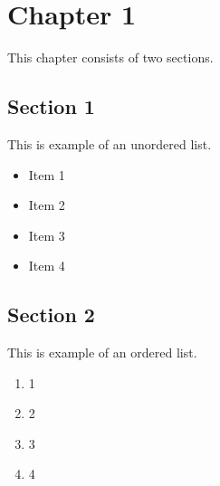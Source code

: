 \chapter{Chapter 1}
\label{chapter:1}

This chapter consists of two sections.

\section{Section 1}
\label{section:1}

This is example of an unordered list.
\begin{itemize}
\item Item 1
\item Item 2
\item Item 3
\item Item 4
\end{itemize}


\section{Section 2}
\label{section:2}

This is example of an ordered list.
\begin{enumerate}
\item 1
\item 2
\item 3
\item 4
\end{enumerate}


